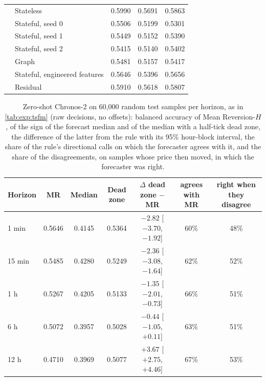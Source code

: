 \begin{table}[t]
\begin{fittable}
\begin{tabular}{llccc}
       & Stateless      & 0.5990 & 0.5691 & 0.5863 \\
       & Stateful, seed 0 & 0.5506 & 0.5199 & 0.5301 \\
       & Stateful, seed 1 & 0.5449 & 0.5152 & 0.5390 \\
       & Stateful, seed 2 & 0.5415 & 0.5140 & 0.5402 \\
       & Graph          & 0.5481 & 0.5157 & 0.5417 \\
       & Stateful, engineered features & 0.5646 & 0.5396 & 0.5656 \\
       & Residual       & 0.5910 & 0.5618 & 0.5807 \\
\bottomrule
\end{tabular}\end{fittable}
\end{table}

\begin{table}[t]
\centering
\caption{Zero-shot Chronos-2 on 60{,}000 random test samples per horizon, as in
\cref{tab:exp:tsfm} (raw decisions, no offsets): balanced accuracy of Mean Reversion-$H$, of
the sign of the forecast median and of the median with a half-tick dead zone, the
difference of the latter from the rule with its 95\% hour-block interval, the share of the
rule's directional calls on which the forecaster agrees with it, and the share of the
disagreements, on samples whose price then moved, in which the forecaster was right.}
\label{tab:test:zeroshot}
\small
\begin{fittable}\begin{tabular}{lcccccc}
\toprule
Horizon & MR & Median & Dead zone & $\Delta$ dead zone $-$ MR & agrees with MR & right when they disagree \\
\midrule
1 min  & 0.5646 & 0.4145 & 0.5364 & $-2.82$ [$-3.70$, $-1.92$] & 60\% & 48\% \\
15 min & 0.5485 & 0.4280 & 0.5249 & $-2.36$ [$-3.08$, $-1.64$] & 62\% & 52\% \\
1 h    & 0.5267 & 0.4205 & 0.5133 & $-1.35$ [$-2.01$, $-0.73$] & 66\% & 51\% \\
6 h    & 0.5072 & 0.3957 & 0.5028 & $-0.44$ [$-1.05$, $+0.11$] & 63\% & 51\% \\
12 h   & 0.4710 & 0.3969 & 0.5077 & $+3.67$ [$+2.75$, $+4.46$] & 67\% & 53\% \\
\bottomrule
\end{tabular}\end{fittable}
\end{table}

